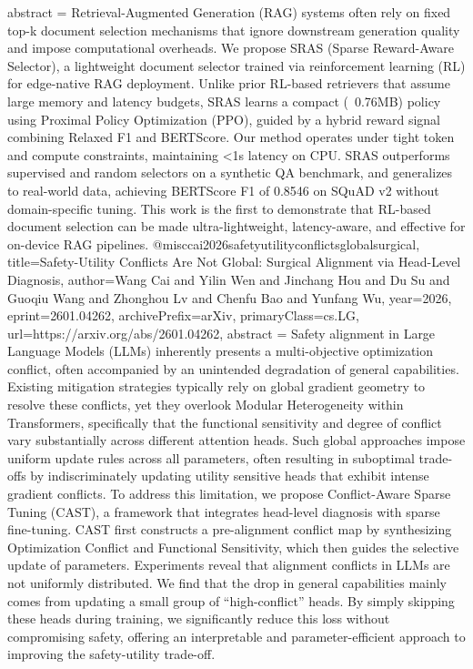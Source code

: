 {      abstract = {Retrieval-Augmented Generation (RAG) systems often rely on fixed top-k document selection mechanisms that ignore downstream generation quality and impose computational overheads. We propose SRAS (Sparse Reward-Aware Selector), a lightweight document selector trained via reinforcement learning (RL) for edge-native RAG deployment. Unlike prior RL-based retrievers that assume large memory and latency budgets, SRAS learns a compact (~0.76MB) policy using Proximal Policy Optimization (PPO), guided by a hybrid reward signal combining Relaxed F1 and BERTScore. Our method operates under tight token and compute constraints, maintaining <1s latency on CPU. SRAS outperforms supervised and random selectors on a synthetic QA benchmark, and generalizes to real-world data, achieving BERTScore F1 of 0.8546 on SQuAD v2 without domain-specific tuning. This work is the first to demonstrate that RL-based document selection can be made ultra-lightweight, latency-aware, and effective for on-device RAG pipelines.}
}@misc{cai2026safetyutilityconflictsglobalsurgical,
      title={Safety-Utility Conflicts Are Not Global: Surgical Alignment via Head-Level Diagnosis}, 
      author={Wang Cai and Yilin Wen and Jinchang Hou and Du Su and Guoqiu Wang and Zhonghou Lv and Chenfu Bao and Yunfang Wu},
      year={2026},
      eprint={2601.04262},
      archivePrefix={arXiv},
      primaryClass={cs.LG},
      url={https://arxiv.org/abs/2601.04262},
      abstract = {Safety alignment in Large Language Models (LLMs) inherently presents a multi-objective optimization conflict, often accompanied by an unintended degradation of general capabilities. Existing mitigation strategies typically rely on global gradient geometry to resolve these conflicts, yet they overlook Modular Heterogeneity within Transformers, specifically that the functional sensitivity and degree of conflict vary substantially across different attention heads. Such global approaches impose uniform update rules across all parameters, often resulting in suboptimal trade-offs by indiscriminately updating utility sensitive heads that exhibit intense gradient conflicts. To address this limitation, we propose Conflict-Aware Sparse Tuning (CAST), a framework that integrates head-level diagnosis with sparse fine-tuning. CAST first constructs a pre-alignment conflict map by synthesizing Optimization Conflict and Functional Sensitivity, which then guides the selective update of parameters. Experiments reveal that alignment conflicts in LLMs are not uniformly distributed. We find that the drop in general capabilities mainly comes from updating a small group of ``high-conflict'' heads. By simply skipping these heads during training, we significantly reduce this loss without compromising safety, offering an interpretable and parameter-efficient approach to improving the safety-utility trade-off.}
}
